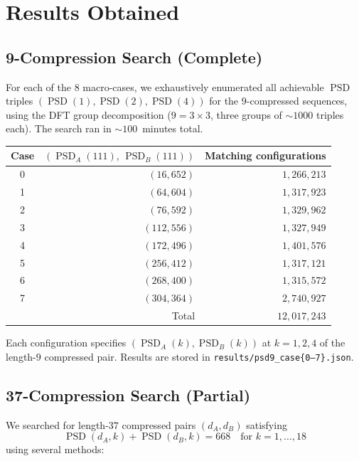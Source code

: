 \documentclass[11pt,a4paper]{article}
\newcommand{\PSD}{\operatorname{PSD}}
\theoremstyle{plain}
\theoremstyle{definition}
\theoremstyle{remark}
\begin{document}
\section{Results Obtained}

\subsection{9-Compression Search (Complete)}
For each of the $8$ macro-cases, we exhaustively enumerated all achievable $\PSD$ triples $(\PSD(1),\PSD(2),\PSD(4))$ for the $9$-compressed sequences, using the DFT group decomposition ($9=3\times3$, three groups of $\sim1000$ triples each). The search ran in $\sim100$~minutes total.

\begin{center}
\begin{tabular}{crr}
\toprule
Case & $(\PSD_A(111),\,\PSD_B(111))$ & Matching configurations \\
\midrule
0 & $(16,652)$ & $1{,}266{,}213$ \\
1 & $(64,604)$ & $1{,}317{,}923$ \\
2 & $(76,592)$ & $1{,}329{,}962$ \\
3 & $(112,556)$ & $1{,}327{,}949$ \\
4 & $(172,496)$ & $1{,}401{,}576$ \\
5 & $(256,412)$ & $1{,}317{,}121$ \\
6 & $(268,400)$ & $1{,}315{,}572$ \\
7 & $(304,364)$ & $2{,}740{,}927$ \\
\midrule
\multicolumn{2}{r}{Total} & $12{,}017{,}243$ \\
\bottomrule
\end{tabular}
\end{center}

Each configuration specifies $(\PSD_A(k),\PSD_B(k))$ at $k=1,2,4$ of the length-$9$ compressed pair. Results are stored in \texttt{results/psd9\_case\{0--7\}.json}.

\subsection{37-Compression Search (Partial)}

We searched for length-$37$ compressed pairs $(d_A,d_B)$ satisfying
\[
\PSD(d_A,k)+\PSD(d_B,k)=668\quad\text{for }k=1,\dots,18
\]
using several methods:
\end{document}
